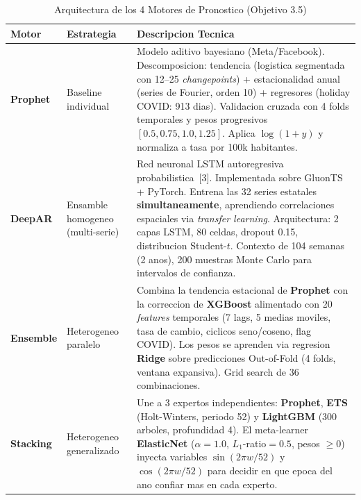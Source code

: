 \documentclass[12pt, letterpaper]{article}
\begin{document}
\begin{table}[H]
\centering
\caption{Arquitectura de los 4 Motores de Pronostico (Objetivo 3.5)}
\label{tab:motores}
\small
\begin{tabularx}{\textwidth}{>{\raggedright\arraybackslash}p{1.8cm} >{\raggedright\arraybackslash}p{2.2cm} X}
\toprule
\textbf{Motor} & \textbf{Estrategia} & \textbf{Descripcion Tecnica} \\
\midrule
\rowcolor{cprophet!10}
\textbf{Prophet} & Baseline individual & Modelo aditivo bayesiano (Meta/Facebook). Descomposicion: tendencia (logistica segmentada con 12--25 \textit{changepoints}) + estacionalidad anual (series de Fourier, orden 10) + regresores (holiday COVID: 913 dias). Validacion cruzada con 4 folds temporales y pesos progresivos $[0.5, 0.75, 1.0, 1.25]$. Aplica $\log(1+y)$ y normaliza a tasa por 100k habitantes. \\
\addlinespace
\rowcolor{cdeepar!10}
\textbf{DeepAR} & Ensamble homogeneo (multi-serie) & Red neuronal LSTM autoregresiva probabilistica~[3]. Implementada sobre GluonTS + PyTorch. Entrena las 32 series estatales \textbf{simultaneamente}, aprendiendo correlaciones espaciales via \textit{transfer learning}. Arquitectura: 2 capas LSTM, 80 celdas, dropout 0.15, distribucion Student-$t$. Contexto de 104 semanas (2 anos), 200 muestras Monte Carlo para intervalos de confianza. \\
\addlinespace
\rowcolor{censemble!10}
\textbf{Ensemble} & Heterogeneo paralelo & Combina la tendencia estacional de \textbf{Prophet} con la correccion de \textbf{XGBoost} alimentado con 20 \textit{features} temporales (7 lags, 5 medias moviles, tasa de cambio, ciclicos seno/coseno, flag COVID). Los pesos se aprenden via regresion \textbf{Ridge} sobre predicciones Out-of-Fold (4 folds, ventana expansiva). Grid search de 36 combinaciones. \\
\addlinespace
\rowcolor{cstacking!10}
\textbf{Stacking} & Heterogeneo generalizado & Une a 3 expertos independientes: \textbf{Prophet}, \textbf{ETS} (Holt-Winters, periodo 52) y \textbf{LightGBM} (300 arboles, profundidad 4). El meta-learner \textbf{ElasticNet} ($\alpha=1.0$, $L_1$-ratio$=0.5$, pesos $\geq 0$) inyecta variables $\sin(2\pi w/52)$ y $\cos(2\pi w/52)$ para decidir en que epoca del ano confiar mas en cada experto. \\
\bottomrule
\end{tabularx}
\end{table}
\end{document}
